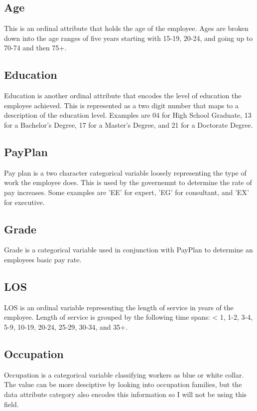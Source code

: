 \documentclass{article}
\begin{document}
    \subsection{Age}
    This is an ordinal attribute that holds the age of the employee. Ages are broken down into the age ranges of five years starting with 15-19, 20-24, and going up to 70-74 and then 75+.

    \subsection{Education}
    Education is another ordinal attribute that encodes the level of education the employee achieved. This is represented as a two digit number that maps to a description of the education level. Examples are 04 for High School Graduate, 13 for a Bachelor's Degree, 17 for a Master's Degree, and 21 for a Doctorate Degree.

    \subsection{PayPlan}
    Pay plan is a two character categorical variable loosely representing the type of work the employee does. This is used by the governemnt to determine the rate of pay increases. Some examples are 'EE' for expert, 'EG' for consultant, and 'EX' for executive.

    \subsection{Grade}
    Grade is a categorical variable used in conjunction with PayPlan to determine an employees basic pay rate.

    \subsection{LOS}
    LOS is an ordinal variable representing the length of service in years of the employee. Length of service is grouped by the following time spans: < 1, 1-2, 3-4, 5-9, 10-19, 20-24, 25-29, 30-34, and 35+.

    \subsection{Occupation}
    Occupation is a categorical variable classifying workers as blue or white collar. The value can be more desciptive by looking into occupation families, but the data attribute category also encodes this information so I will not be using this field.
\end{document}

